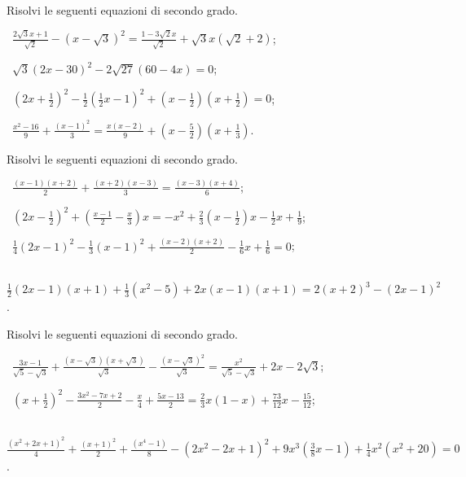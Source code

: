 \begin{esercizio}[\Ast]
 \label{ese:3.33}
Risolvi le seguenti equazioni di secondo grado.
 \begin{enumeratea}
 \item~$\frac{2 \sqrt{3} x + 1}{\sqrt{2}}-\left(x-\sqrt{3} \right)^{2} = \frac{1-3 \sqrt{2} x}{\sqrt{2}} + \sqrt{3} x \left(\sqrt{2}+ 2 \right)$;
 \item~$\sqrt{3} (2 x-30)^{2}-2 \sqrt{27} (60-4 x) = 0$;
 \item~$\left(2 x + \frac{1}{2} \right)^{2}-\frac{1}{2} \left(\frac{1}{2} x-1 \right)^{2} + \left(x-\frac{1}{2} \right) \left(x + \frac{1}{2} \right) = 0$;
 \item~$\frac{x^{2}-16}{9} + \frac{(x-1)^{2}}{3} = \frac{x (x -2)}{9} + \left(x-\frac{5}{2} \right) \left(x + \frac{1}{3}\right)$.
 \end{enumeratea}
\end{esercizio}

 \begin{esercizio}[\Ast]
\label{ese:3.34}
Risolvi le seguenti equazioni di secondo grado.
 \begin{enumeratea}
 \item~$\frac{(x-1) (x + 2)}{2} + \frac{(x + 2) (x-3)}{3} =\frac{(x-3) (x + 4)}{6}$;
 \item~$\left(2 x-\frac{1}{2} \right)^{2} + \left(\frac{x-1}{2} -\frac{x}{3} \right) x =-x^{2} + \frac{2}{3} \left(x-\frac{1}{2}\right) x-\frac{1}{2} x + \frac{1}{9}$;
 \item~$\frac{1}{4} (2 x-1)^{2}-\frac{1}{3} (x-1)^{2} +\frac{(x-2) (x + 2)}{2}-\frac{1}{6} x + \frac{1}{6} = 0$;
 \item~$\frac{1}{2} (2 x-1) (x + 1) + \frac{1}{3} \left(x^{2}-5\right) + 2 x (x-1) (x + 1) = 2 (x + 2)^{3}-(2 x-1)^{2}$.
 \end{enumeratea}
\end{esercizio}

\begin{esercizio}[\Ast]
\label{ese:3.35}
Risolvi le seguenti equazioni di secondo grado.
 \begin{enumeratea}
 \item~$\frac{3 x-1}{\sqrt{5}-\sqrt{3}} + \frac{\left(x-\sqrt{3}\right) \left(x + \sqrt{3} \right)}{\sqrt{3}}-\frac{\left(x -\sqrt{3} \right)^{2}}{\sqrt{3}} = \frac{x^{2}}{\sqrt{5}-\sqrt{3}} + 2 x-2 \sqrt{3}$;
 \item~$\left(x + \frac{1}{2} \right)^{2}-\frac{3 x^{2}-7 x + 2}{2} - \frac{x}{4} + \frac{5 x-13}{2} = \frac{2}{3} x (1-x) +\frac{73}{12} x-\frac{15}{12}$;
 \item~$\frac{(x^{2} + 2 x + 1)^{2}}{4} + \frac{(x + 1)^{2}}{2}+ \frac{(x^{4}-1)}{8}-(2 x^{2}-2 x + 1)^{2} + 9 x^{3}\left(\frac{3}{8} x-1 \right) + \frac{1}{4} x^{2} (x^{2} + 20)= 0$.
 \end{enumeratea}
\end{esercizio}

